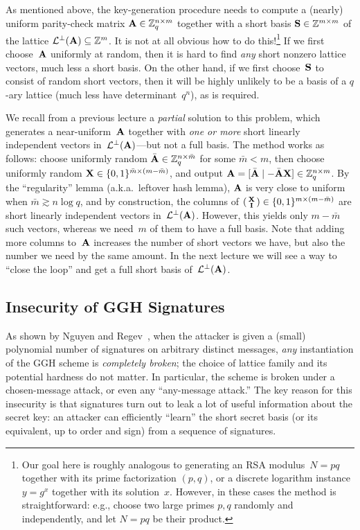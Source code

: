 \documentclass[11pt]{article}
\begin{document}
As mentioned above, the key-generation procedure needs to compute a
(nearly) uniform parity-check matrix $\mathbf{A} \in \mathbb{Z}_q^{n \times m}$
together with a short basis $\mathbf{S} \in \mathbb{Z}^{m \times m}$ of the lattice
$\mathcal{L}^{\perp}(\mathbf{A}) \subseteq \mathbb{Z}^{m}$. It is not at all obvious how to do
this!\footnote{Our goal here is roughly analogous to generating an RSA
  modulus~$N=pq$ together with its prime factorization $(p,q)$, or a
  discrete logarithm instance $y=g^{x}$ together with its
  solution~$x$. However, in these cases the method is straightforward:
  e.g., choose two large primes $p,q$ randomly and independently, and
  let $N=pq$ be their product.} If we first choose~$\mathbf{A}$ uniformly
at random, then it is hard to find \emph{any} short nonzero lattice
vectors, much less a short basis. On the other hand, if we first
choose~$\mathbf{S}$ to consist of random short vectors, then it will be
highly unlikely to be a basis of a $q$-ary lattice (much less have
determinant~$q^{n}$), as is required.

We recall from a previous lecture a \emph{partial} solution to this
problem, which generates a near-uniform~$\mathbf{A}$ together with
\emph{one or more} short linearly independent vectors
in~$\mathcal{L}^{\perp}(\mathbf{A})$---but not a full basis. The method works as
follows: choose uniformly random
$\bar{\mathbf{A}} \in \mathbb{Z}_q^{n \times \bar{m}}$ for some $\bar{m} < m$, then
choose uniformly random $\mathbf{X} \in \{0,1\}^{\bar{m} \times (m-\bar{m})}$,
and output
$\mathbf{A} = [\bar{\mathbf{A}} \mid -\bar{\mathbf{A}} \mathbf{X}] \in \mathbb{Z}_q^{n \times m}$.
By the ``regularity'' lemma (a.k.a.\ leftover hash lemma), $\mathbf{A}$ is
very close to uniform when $\bar{m} \gtrsim n \log q$, and by
construction, the columns of
$\left(\begin{smallmatrix}\mathbf{X} \\ \mathbf{I}\end{smallmatrix}\right) \in \{0,1\}^{m \times (m-\bar{m})}$ are short
linearly independent vectors in~$\mathcal{L}^{\perp}(\mathbf{A})$. However, this
yields only $m-\bar{m}$ such vectors, whereas we need~$m$ of them to
have a full basis. Note that adding more columns to~$\mathbf{A}$ increases
the number of short vectors we have, but also the number we need by
the same amount. In the next lecture we will see a way to ``close the
loop'' and get a full short basis of~$\mathcal{L}^{\perp}(\mathbf{A})$.

\subsection{Insecurity of GGH Signatures}
\label{sec:insecurity-ggh}

As shown by Nguyen and Regev~\cite{DBLP:journals/joc/NguyenR09}, when
the attacker is given a (small) polynomial number of signatures on
arbitrary distinct messages, \emph{any} instantiation of the GGH
scheme is \emph{completely broken}; the choice of lattice family and
its potential hardness do not matter. In particular, the scheme is
broken under a chosen-message attack, or even any ``any-message
attack.'' The key reason for this insecurity is that signatures turn
out to leak a lot of useful information about the secret key: an
attacker can efficiently ``learn'' the short secret basis (or its
equivalent, up to order and sign) from a sequence of signatures.
\end{document}
